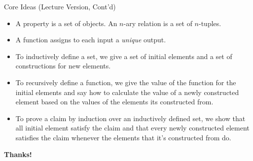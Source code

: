 \documentclass[../slides.tex]{subfiles}
\begin{document}
\begin{frame}{Core Ideas (Lecture Version, Cont'd)}
	
\begin{itemize}
			
		\item A property is a set of objects. An $n$-ary relation is a set of $n$-tuples.
		
		\item A function assigns to each input a \emph{unique} output.
		
		\item To inductively define a set, we give a set of initial elements and a set of constructions for new elements.
		
		\item To recursively define a function, we give the value of the function for the initial elements and say how to calculate the value of a newly constructed element based on the values of the elements its constructed from.
		
		\item To prove a claim by induction over an inductively defined set, we show that all initial element satisfy the claim and that every newly constructed element satisfies the claim whenever the elements that it's constructed from do.
			

	\end{itemize}


\end{frame}

\begin{frame}

	\begin{center}
	{\huge\bf Thanks!}
	\end{center}

\end{frame}
\end{document}
